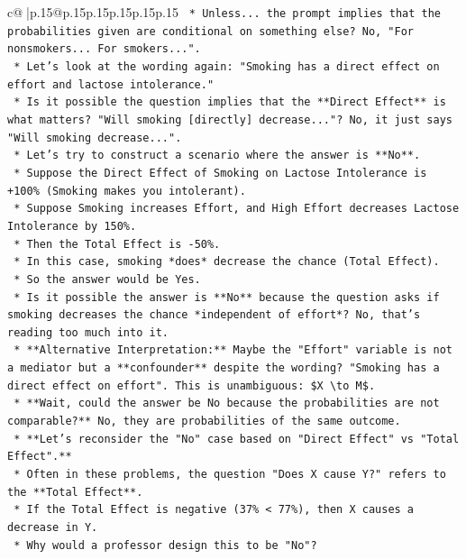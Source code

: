 \documentclass{article}
\begin{document}
{\begin{supertabular}{c@{$\;$}|p{.15\linewidth}@{}p{.15\linewidth}p{.15\linewidth}p{.15\linewidth}p{.15\linewidth}p{.15\linewidth}}
{{{\texttt{        *   Unless... the prompt implies that the probabilities given are conditional on something else? No, "For nonsmokers... For smokers...".} \\
\texttt{        *   Let's look at the wording again: "Smoking has a direct effect on effort and lactose intolerance."} \\
\texttt{        *   Is it possible the question implies that the **Direct Effect** is what matters? "Will smoking {[}directly{]} decrease..."? No, it just says "Will smoking decrease...".} \\
\texttt{        *   Let's try to construct a scenario where the answer is **No**.} \\
\texttt{            *   Suppose the Direct Effect of Smoking on Lactose Intolerance is +100\% (Smoking makes you intolerant).} \\
\texttt{            *   Suppose Smoking increases Effort, and High Effort decreases Lactose Intolerance by 150\%.} \\
\texttt{            *   Then the Total Effect is {-}50\%.} \\
\texttt{            *   In this case, smoking *does* decrease the chance (Total Effect).} \\
\texttt{            *   So the answer would be Yes.} \\
\texttt{        *   Is it possible the answer is **No** because the question asks if smoking decreases the chance *independent of effort*? No, that's reading too much into it.} \\
\texttt{        *   **Alternative Interpretation:** Maybe the "Effort" variable is not a mediator but a **confounder** despite the wording? "Smoking has a direct effect on effort". This is unambiguous: \$X \textbackslash{}to M\$.} \\
\texttt{        *   **Wait, could the answer be No because the probabilities are not comparable?** No, they are probabilities of the same outcome.} \\
\texttt{        *   **Let's reconsider the "No" case based on "Direct Effect" vs "Total Effect".**} \\
\texttt{            *   Often in these problems, the question "Does X cause Y?" refers to the **Total Effect**.} \\
\texttt{            *   If the Total Effect is negative (37\% < 77\%), then X causes a decrease in Y.} \\
\texttt{            *   Why would a professor design this to be "No"?} \\
}}}
\end{supertabular}}
\end{document}

